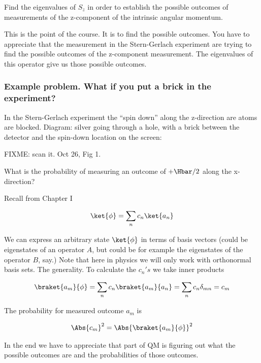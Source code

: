 Find the eigenvalues of $S_z$ in order to establish the possible outcomes of measurements of the z-component of the intrinsic angular momentum.

This is the point of the course.  It is to find the possible outcomes.  You have to appreciate that the measurement in the Stern-Gerlach experiment are trying to find the possible outcomes of the z-component measurement.  The eigenvalues of this operator give us those possible outcomes.

\subsubsection{Example problem.  What if you put a brick in the experiment?}

In the Stern-Gerlach experiment the ``spin down'' along the z-direction are atoms are blocked.  Diagram: silver going through a hole, with a brick between the detector and the spin-down location on the screen:

FIXME: scan it.  Oct 26, Fig 1.

What is the probability of measuring an outcome of $+\Hbar/2$ along the x-direction?

Recall from Chapter I

\begin{align}\label{eqn:PHY356Foct26:103}
\ket{\phi} = \sum_n c_n \ket{a_n}
\end{align}

We can express an arbitrary state $\ket{\phi}$ in terms of basis vectors (could be eigenstates of an operator $A$, but could be for example the eigenstates of the operator $B$, say.)  Note that here in physics we will only work with orthonormal basis sets.  The generality.  To calculate the $c_n's$ we take inner products

\begin{align}\label{eqn:PHY356Foct26:104}
\braket{a_m}{\phi} = \sum_n c_n \braket{a_m}{a_n} = \sum_n c_n \delta_{mn} = c_m
\end{align}

The probability for measured outcome $a_m$ is

\begin{align}\label{eqn:PHY356Foct26:105}
\Abs{c_m}^2 = \Abs{ \braket{a_m}{\phi} }^2
\end{align}

In the end we have to appreciate that part of QM is figuring out what the possible outcomes are and the probabilities of those outcomes.

